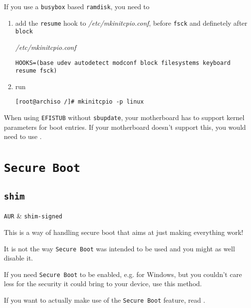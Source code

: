 \documentclass[10pt]{dustdoc}
\begin{document}
\begin{NOTE}
    If you use a \texttt{busybox} based \texttt{ramdisk}, you need to

    \begin{enumerate}
        \item add the \texttt{resume} hook to \textit{/etc/mkinitcpio.conf}, before \texttt{fsck} and definetely after \texttt{block}

            \begin{mintedlisting}
                \caption*{\textit{/etc/mkinitcpio.conf}}
                \begin{verbatim}
HOOKS=(base udev autodetect modconf block filesystems keyboard resume fsck)
                \end{verbatim}
            \end{mintedlisting}
        \item run

            \begin{verbatim}
[root@archiso /]# mkinitcpio -p linux
            \end{verbatim}
    \end{enumerate}
\end{NOTE}

\begin{NOTE}
    When using \texttt{EFISTUB} without \texttt{sbupdate}, your motherboard has to support kernel parameters for boot entries.
    If your motherboard doesn’t support this, you would need to use .
\end{NOTE}

\section{\texttt{Secure Boot}}
\label{sec:secure-boot}

\subsection{\texttt{shim}}
\label{sec:shim}

\begin{packagetable}
    \texttt{AUR} & \texttt{shim-signed} \\ 
\end{packagetable}

\begin{WARNING}
    This is a way of handling secure boot that aims at just making everything work!

    It is not the way \texttt{Secure Boot} was intended to be used and you might as well disable it.

    If you need \texttt{Secure Boot} to be enabled, e.g. for Windows, but you couldn’t care less for the security it could bring to your device, use this method.

    If you want to actually make use of the \texttt{Secure Boot} feature, read .
\end{WARNING}
\end{document}
